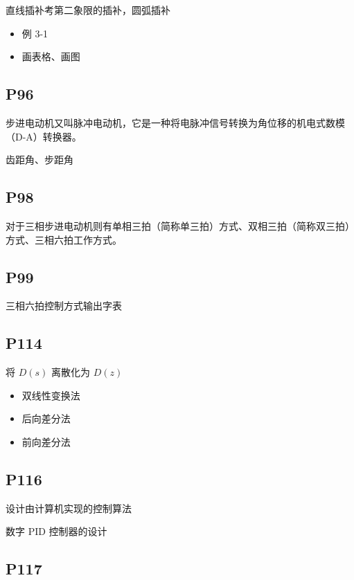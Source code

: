 \documentclass[zihao=-4
]{ctexart}%
\begin{document}
直线插补考第二象限的插补，圆弧插补

\begin{itemize}
\item
  例 3-1
\item
  画表格、画图
\end{itemize}

\hypertarget{header-n163}{%
\subsection{P96}\label{header-n163}}

步进电动机又叫脉冲电动机，它是一种将电脉冲信号转换为角位移的机电式数模（D-A）转换器。

齿距角、步距角

\hypertarget{header-n166}{%
\subsection{P98}\label{header-n166}}

对于三相步进电动机则有单相三拍（简称单三拍）方式、双相三拍（简称双三拍）方式、三相六拍工作方式。

\hypertarget{header-n168}{%
\subsection{P99}\label{header-n168}}

三相六拍控制方式输出字表

\hypertarget{header-n170}{%
\subsection{P114}\label{header-n170}}

将 \(D(s)\) 离散化为 \(D(z)\)

\begin{itemize}
\item
  双线性变换法
\item
  后向差分法
\item
  前向差分法
\end{itemize}

\hypertarget{header-n179}{%
\subsection{P116}\label{header-n179}}

设计由计算机实现的控制算法

数字 PID 控制器的设计

\hypertarget{header-n182}{%
\subsection{P117}\label{header-n182}}
\end{document}

